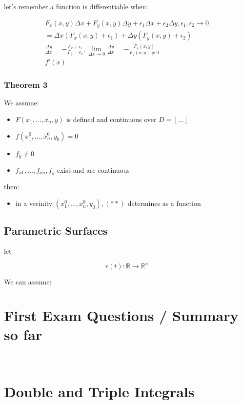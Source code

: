 \documentclass[11pt,fleqn]{book} %
\begin{document}
let's remember a function is differentiable when:

\begin{gather}
    F_x (x,y) \Delta x + F_y (x,y) \Delta y + \epsilon_1 \Delta x + \epsilon_2 \Delta y, \epsilon_1, \epsilon_2 \rightarrow 0 \\
    = \Delta x (F_x(x,y) + \epsilon_1) + \Delta y (F_y (x,y)+ \epsilon_2) \\
    \frac{\Delta y}{\Delta x} = - \frac{F_x + \epsilon_1}{F_y = \epsilon_2}, \lim_{\Delta x \to 0} \frac{\Delta y}{\Delta x} = - \frac{F_x(x,y)}{F_y(x,y) \neq 0}\\
    f'(x)
\end{gather}

\subsection{Theorem 3}

We assume:
\begin{itemize}
    \item $F(x_1,\dots,x_n, y)$ is defined and continuous over $D = [\dots]$
    \item $f(x_1^0,\dots,x_n^0,y_0) = 0$
    \item $f_y \neq 0$
    \item $f_{x1}, \dots, f_{xn}, f_y$ exist and are continuous
\end{itemize}

then:

\begin{itemize}
    \item in a vecinity $(x_1^0, \dots, x_n^0, y_0),(**)$ determines as a function
\end{itemize}

\section{Parametric Surfaces}

let 

$$r(t): \mathbb{R} \to \mathbb{R}^n$$

We can assume:


\chapter{First Exam Questions / Summary so far}

\

\chapter{Double and Triple Integrals}
\end{document}
